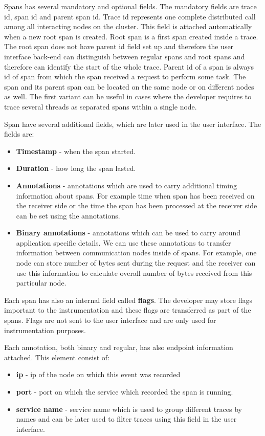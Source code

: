 Spans has several mandatory and optional fields. The mandatory fields are trace id, span id and parent span id. Trace id represents one complete distributed call among all interacting nodes on the cluster. This field is attached automatically when a new root span is created. Root span is a first span created inside a trace. The root span does not have parent id field set up and therefore the user interface back-end can distinguish between regular spans and root spans and therefore can identify the start of the whole trace. Parent id of a span is always id of span from which the span received a request to perform some task. The span and its parent span can be located on the same node or on different nodes as well. The first variant can be useful in cases where the developer requires to trace several threads as separated spans within a single node.  

Span have several additional fields, which are later used in the user interface. The fields are:
\begin{itemize}
	\item \textbf{Timestamp} - when the span started.
	\item \textbf{Duration} - how long the span lasted.
	\item \textbf{Annotations} - annotations which are used to carry additional timing information about spans. For example time when span has been received on the receiver side or the time the span has been processed at the receiver side can be set using the annotations.
	\item \textbf{Binary annotations} - annotations which can be used to carry around application specific details. We can use these annotations to transfer information between communication nodes inside of spans. For example, one node can store number of bytes sent during the request and the receiver can use this information to calculate overall number of bytes received from this particular node.
\end{itemize}
Each span has also an internal field called \textbf{flags}. The developer may store flags important to the instrumentation and these flags are transferred as part of the spans. Flags are not sent to the user interface and are only used for instrumentation purposes.

Each annotation, both binary and regular, has also endpoint information attached. This element consist of:
\begin{itemize}
	\item \textbf{ip} - ip of the node on which this event was recorded
	\item \textbf{port} - port on which the service which recorded the span is running.
	\item \textbf{service name} - service name which is used to group different traces by names and can be later used to filter traces using this field in the user interface.
\end{itemize}

